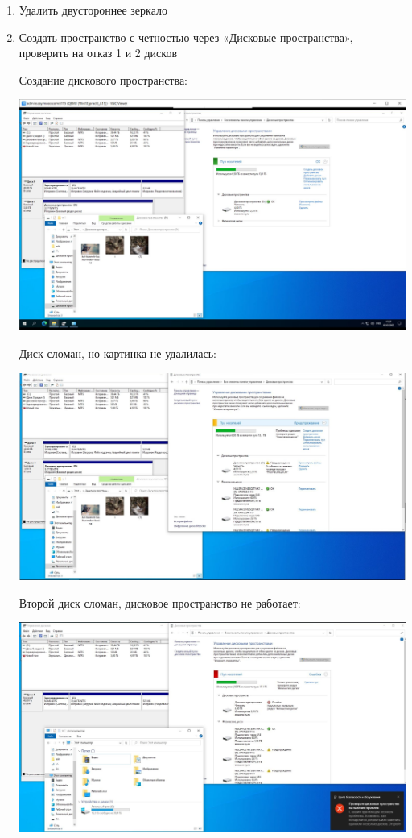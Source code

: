 \documentclass[a4paper,14pt]{extarticle}
\begin{document}
\begin{enumerate}
		\item Удалить двустороннее зеркало
		\item Создать пространство с четностью через «Дисковые
		пространства», проверить на отказ 1 и 2 дисков
		
		Создание дискового пространства:
		\begin{center}
			\includegraphics[width=\textwidth]{15}
		\end{center}
		
		\newpage
		Диск сломан, но картинка не удалилась:
		\begin{center}
			\includegraphics[width=\textwidth]{16}
		\end{center}
		
		Второй диск сломан, дисковое пространство не работает:
		\begin{center}
			\includegraphics[width=\textwidth]{17}
		\end{center}
	\end{enumerate}
\end{document}
